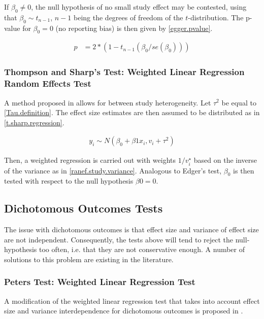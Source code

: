 \documentclass[11pt,a4paper,twoside]{book}\usepackage[]{graphicx}\usepackage[]{color}
\begin{document}
\vspace{0mm}
If $\beta_{0} \ne 0$, the null hypothesis of no small study effect may be contested, using that $\beta_{0} \sim t_{n-1}$, $n-1$ being the degrees of freedom of the $t$-distribution. The p-value for $\beta_{0} = 0$ (no reporting bias) is then given by \ref{egger.pvalue}.

\begin{align}
p &= 2*(1 - t_{n-1}(\beta_{0}/se(\beta_{0}))) \label{egger.pvalue}
\end{align}

\subsubsection{Thompson and Sharp's Test: Weighted Linear Regression Random Effects Test}
A method proposed in \citet{thompson.sharp} allows for between study heterogeneity. Let $\tau^2$ be equal to \ref{Tau.definition}. The effect size estimates are then assumed to be distributed as in \ref{t.sharp.regression}. 

\begin{align}
y_{i} \sim N(\beta_{0} + \beta{1}x_{i}, v_{i} + \tau^2) \label{t.sharp.regression}
\end{align}

Then, a weighted regression is carried out with weights $1/v_{i}^\star$ based on the inverse of the variance as in \ref{ranef.study.variance}. Analogous to Edger's test, $\beta_{0}$ is then tested with respect to the null hypothesis $\beta{0} = 0$.

\subsection{Dichotomous Outcomes Tests}

The issue with dichotomous outcomes is that effect size and variance of effect size are not independent. Consequently, the tests above will tend to reject the null-hypothesis too often, i.e. that they are not conservative enough. A number of solutions to this problem are existing in the literature.


\subsubsection{Peters Test: Weighted Linear Regression Test}
A modification of the weighted linear regression test that takes into account effect size and variance interdependence for dichotomous outcomes is proposed in \citet{Peters}.
\end{document}
